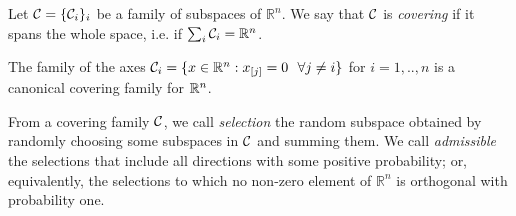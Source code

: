 \begin{definition}\label{def:cov}
Let $\mathcal{C} = \{ \mathcal{C}_i \}_i$ be a family of subspaces of $\mathbb{R}^n$. We say that $\mathcal{C}$ is \emph{covering} if it spans the whole space, i.e. if $\sum_i \mathcal{C}_i = \mathbb{R}^n$.
\end{definition}

\begin{example}\label{ex:axes}%
The family of the axes $\mathcal{C}_i = \{x\in\mathbb{R}^n  : x_{[j]} = 0 ~~ \forall j \neq i \}$ for $i=1,..,n$ is a canonical covering family for $\mathbb{R}^n$. %
\hfill
\end{example}

{From a covering family $\mathcal{C}$, we call \emph{selection} the random subspace obtained by randomly choosing some subspaces in $\mathcal{C}$ and summing them. We call \emph{admissible} the selections that include all directions with some positive probability; or, equivalently, the selections to which no non-zero element of $\mathbb{R}^n$ is orthogonal with probability one.}


